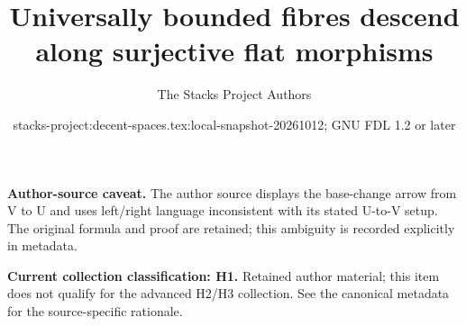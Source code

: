 \documentclass{stacks-project}
\title{Universally bounded fibres descend along surjective flat morphisms}
\author{The Stacks Project Authors}
\date{stacks-project:decent-spaces.tex:local-snapshot-20261012; GNU FDL 1.2 or later}
\theoremstyle{plain}
\theoremstyle{definition}
\theoremstyle{remark}
\numberwithin{equation}{subsection}
\begin{document}
\maketitle
\par\medskip\noindent\textbf{Author-source caveat.} The author source displays the base-change arrow from V to U and uses left/right language inconsistent with its stated U-to-V setup. The original formula and proof are retained; this ambiguity is recorded explicitly in metadata.\par\medskip

\par\medskip\noindent\textbf{Current collection classification: H1.} Retained author material; this item does not qualify for the advanced H2/H3 collection. See the canonical metadata for the source-specific rationale.\par\medskip
\end{document}

